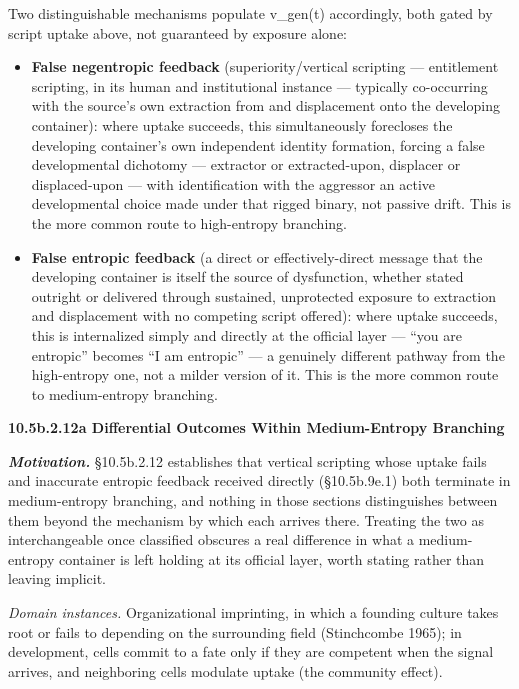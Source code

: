 \documentclass[
]{article}
\begin{document}
Two distinguishable mechanisms populate v\_gen(t) accordingly, both
gated by script uptake above, not guaranteed by exposure alone:

\begin{itemize}
\item
  \textbf{False negentropic feedback} (superiority/vertical scripting
  --- entitlement scripting, in its human and institutional instance ---
  typically co-occurring with the source's own extraction from and
  displacement onto the developing container): where uptake succeeds,
  this simultaneously forecloses the developing container's own
  independent identity formation, forcing a false developmental
  dichotomy --- extractor or extracted-upon, displacer or displaced-upon
  --- with identification with the aggressor an active developmental
  choice made under that rigged binary, not passive drift. This is the
  more common route to high-entropy branching.
\item
  \textbf{False entropic feedback} (a direct or effectively-direct
  message that the developing container is itself the source of
  dysfunction, whether stated outright or delivered through sustained,
  unprotected exposure to extraction and displacement with no competing
  script offered): where uptake succeeds, this is internalized simply
  and directly at the official layer --- ``you are entropic'' becomes
  ``I am entropic'' --- a genuinely different pathway from the
  high-entropy one, not a milder version of it. This is the more common
  route to medium-entropy branching.
\end{itemize}

\textbf{10.5b.2.12a Differential Outcomes Within Medium-Entropy
Branching}

\emph{\textbf{Motivation.}} §10.5b.2.12 establishes that vertical
scripting whose uptake fails and inaccurate entropic feedback received
directly (§10.5b.9e.1) both terminate in medium-entropy branching, and
nothing in those sections distinguishes between them beyond the
mechanism by which each arrives there. Treating the two as
interchangeable once classified obscures a real difference in what a
medium-entropy container is left holding at its official layer, worth
stating rather than leaving implicit.

\emph{Domain instances.} Organizational imprinting, in which a founding
culture takes root or fails to depending on the surrounding field
(Stinchcombe 1965); in development, cells commit to a fate only if they
are competent when the signal arrives, and neighboring cells modulate
uptake (the community effect).
\end{document}
